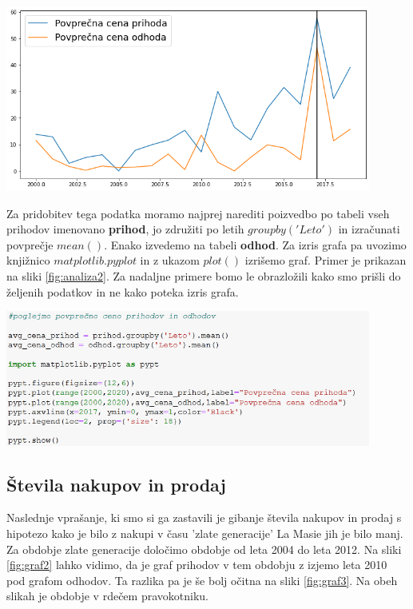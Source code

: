 \documentclass[a4paper, 12pt]{article}
\begin{document}
\begin{center}
\includegraphics[width=0.9\textwidth]{graf1}
\label{fig:graf1}
\end{center}

Za pridobitev tega podatka moramo najprej narediti poizvedbo po tabeli vseh prihodov imenovano \textbf{prihod}, jo združiti po letih $groupby('Leto')$ in izračunati povprečje $mean()$. Enako izvedemo na tabeli \textbf{odhod}. 
Za izris grafa pa uvozimo knjižnico $matplotlib.pyplot$ in z ukazom $plot()$ izrišemo graf. Primer je prikazan na sliki \ref{fig:analiza2}. Za nadaljne primere bomo le obrazložili kako smo prišli do željenih podatkov in ne kako poteka izris grafa.

\begin{center}
\includegraphics[width=0.9\textwidth]{analiza2}
\label{fig:analiza2}
\end{center} \medskip

\subsection{Števila nakupov in prodaj}
Naslednje vprašanje, ki smo si ga zastavili je gibanje števila nakupov in prodaj s hipotezo kako je bilo z nakupi v času 'zlate generacije' La Masie jih je bilo manj. Za obdobje zlate generacije določimo obdobje od leta 2004 do leta 2012. Na sliki \ref{fig:graf2} lahko vidimo, da je graf prihodov v tem obdobju z izjemo leta 2010 pod grafom odhodov. Ta razlika pa je še bolj očitna na sliki \ref{fig:graf3}. Na obeh slikah je obdobje v rdečem pravokotniku.
\end{document}
